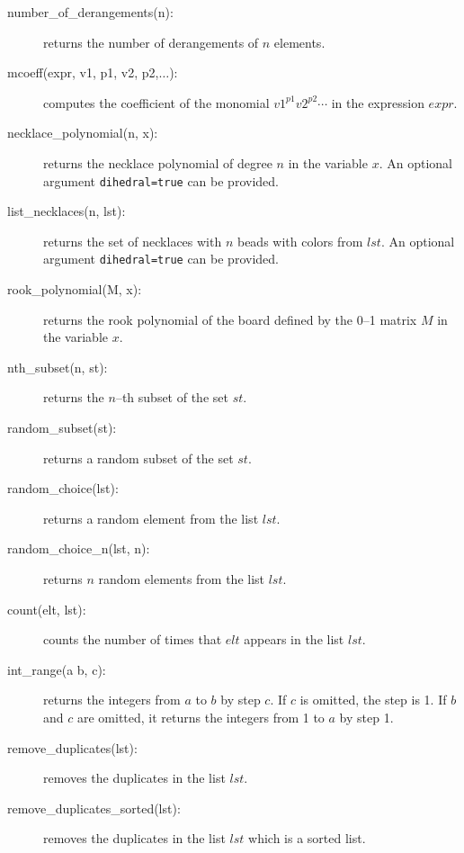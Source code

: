 \documentclass[11pt]{article}
\begin{document}
\begin{description}
  \item [number\_of\_derangements(n):] returns the number of
    derangements of $n$ elements.
  \item [mcoeff(expr, v1, p1, v2, p2,$\ldots$):] computes the
    coefficient of the monomial $v1^{p1}v2^{p2}\cdots$ in the
    expression $expr$.
  \item [necklace\_polynomial(n, x):] returns the necklace polynomial
    of degree $n$ in the variable $x$. An optional argument
    \texttt{dihedral=true} can be provided.
  \item [list\_necklaces(n, lst):] returns the set of necklaces with
    $n$ beads with colors from $lst$. An optional argument
    \texttt{dihedral=true} can be provided.
  \item [rook\_polynomial(M, x):] returns the rook polynomial of the
    board defined by the 0--1 matrix $M$ in the variable $x$.
  \item [nth\_subset(n, st):] returns the $n$--th subset of the set
    $st$.
  \item [random\_subset(st):] returns a random subset of the set $st$.
  \item [random\_choice(lst):] returns a random element from the list
    $lst$.
  \item [random\_choice\_n(lst, n):] returns $n$ random elements from
    the list $lst$.
  \item [count(elt, lst):] counts the number of times that $elt$
    appears in the list $lst$.
  \item [int\_range(a b, c):] returns the integers from $a$ to $b$ by
    step $c$. If $c$ is omitted, the step is 1. If $b$ and $c$ are
    omitted, it returns the integers from 1 to $a$ by step 1.
  \item[remove\_duplicates(lst):] removes the duplicates in the
    list $lst$.
  \item[remove\_duplicates\_sorted(lst):] removes the duplicates
    in the list $lst$ which is a sorted list.
\end{description}
\end{document}
